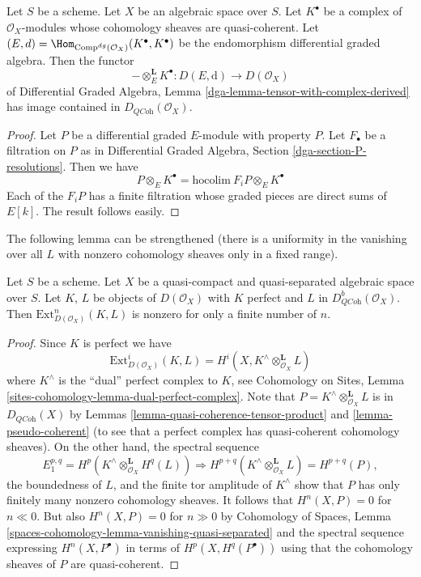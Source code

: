 \begin{lemma}
\label{lemma-tensor-with-QCoh-complex}
Let $S$ be a scheme. Let $X$ be an algebraic space over $S$. Let $K^\bullet$
be a complex of $\mathcal{O}_X$-modules whose cohomology sheaves are
quasi-coherent. Let
$(E, d) = \Hom_{\text{Comp}^{dg}(\mathcal{O}_X)}(K^\bullet, K^\bullet)$
be the endomorphism differential graded algebra. Then the functor
$$
- \otimes_E^\mathbf{L} K^\bullet :
D(E, \text{d}) \longrightarrow D(\mathcal{O}_X)
$$
of
Differential Graded Algebra, Lemma
\ref{dga-lemma-tensor-with-complex-derived}
has image contained in $D_{\textit{QCoh}}(\mathcal{O}_X)$.
\end{lemma}

\begin{proof}
Let $P$ be a differential graded $E$-module with property $P$.
Let $F_\bullet$ be a filtration on $P$ as in
Differential Graded Algebra, Section \ref{dga-section-P-resolutions}.
Then we have
$$
P \otimes_E K^\bullet = \text{hocolim}\ F_iP \otimes_E K^\bullet
$$
Each of the $F_iP$ has a finite filtration whose graded pieces
are direct sums of $E[k]$. The result follows easily.
\end{proof}

\noindent
The following lemma can be strengthened (there is a uniformity
in the vanishing over all $L$ with nonzero cohomology sheaves
only in a fixed range).

\begin{lemma}
\label{lemma-ext-from-perfect-into-bounded-QCoh}
Let $S$ be a scheme.
Let $X$ be a quasi-compact and quasi-separated algebraic space over $S$.
Let $K$, $L$ be objects of $D(\mathcal{O}_X)$ with
$K$ perfect and $L$ in $D^b_{\textit{QCoh}}(\mathcal{O}_X)$.
Then $\text{Ext}^n_{D(\mathcal{O}_X)}(K, L)$ is nonzero
for only a finite number of $n$.
\end{lemma}

\begin{proof}
Since $K$ is perfect we have
$$
\text{Ext}^i_{D(\mathcal{O}_X)}(K, L) =
H^i(X, K^\wedge \otimes_{\mathcal{O}_X}^\mathbf{L} L)
$$
where $K^\wedge$ is the ``dual'' perfect complex to $K$, see
Cohomology on Sites, Lemma \ref{sites-cohomology-lemma-dual-perfect-complex}.
Note that $P = K^\wedge \otimes_{\mathcal{O}_X}^\mathbf{L} L$
is in $D_{\textit{QCoh}}(X)$ by
Lemmas \ref{lemma-quasi-coherence-tensor-product} and
\ref{lemma-pseudo-coherent} (to see that a perfect complex
has quasi-coherent cohomology sheaves). On the other hand,
the spectral sequence
$$
E_1^{p, q} = H^p(K^\wedge \otimes_{\mathcal{O}_X}^\mathbf{L} H^q(L))
\Rightarrow
H^{p + q}(K^\wedge \otimes_{\mathcal{O}_X}^\mathbf{L} L) = H^{p + q}(P),
$$
the boundedness of $L$, and the finite tor amplitude of $K^\wedge$
show that $P$ has only finitely many nonzero cohomology sheaves.
It follows that $H^n(X, P) = 0$ for $n \ll 0$.
But also $H^n(X, P) = 0$ for $n \gg 0$ by
Cohomology of Spaces, Lemma
\ref{spaces-cohomology-lemma-vanishing-quasi-separated}
and the spectral sequence expressing $H^n(X, P^\bullet)$
in terms of $H^p(X, H^q(P^\bullet))$ using that the cohomology
sheaves of $P$ are quasi-coherent.
\end{proof}


